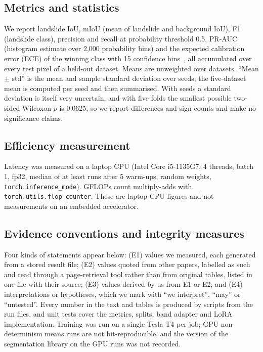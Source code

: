 \documentclass[11pt]{article}
\newcommand{\iou}{IoU}
\begin{document}
\subsection{Metrics and statistics}
We report landslide \iou{}, mIoU (mean of landslide and background \iou{}), F1 (landslide class), precision and recall at probability threshold 0.5, PR-AUC (histogram estimate over 2{,}000 probability bins) and the expected calibration error (ECE) of the winning class with 15 confidence bins~\cite{guo2017calib}, all accumulated over every test pixel of a held-out dataset. Means are unweighted over datasets. ``Mean $\pm$ std'' is the mean and sample standard deviation over seeds; the five-dataset mean is computed per seed and then summarised. With \NumSeeds{} seeds a standard deviation is itself very uncertain, and with five folds the smallest possible two-sided Wilcoxon $p$ is 0.0625, so we report differences and sign counts and make no significance claims.

\subsection{Efficiency measurement}
Latency was measured on a laptop CPU (Intel Core i5-1135G7, 4 threads, batch 1, fp32, median of at least \LatRuns{} runs after 5 warm-ups, random weights, \texttt{torch.inference\_mode}). GFLOPs count multiply-adds with \texttt{torch.utils.flop\_counter}. These are laptop-CPU figures and not measurements on an embedded accelerator.

\subsection{Evidence conventions and integrity measures}
Four kinds of statements appear below: (E1) values we measured, each generated from a stored result file; (E2) values quoted from other papers, labelled as such and read through a page-retrieval tool rather than from original tables, listed in one file with their source; (E3) values derived by us from E1 or E2; and (E4) interpretations or hypotheses, which we mark with ``we interpret'', ``may'' or ``untested''. Every number in the text and tables is produced by scripts from the run files, and unit tests cover the metrics, splits, band adapter and LoRA implementation. Training was run on a single Tesla T4 per job; GPU non-determinism means runs are not bit-reproducible, and the version of the segmentation library on the GPU runs was not recorded.
\end{document}
